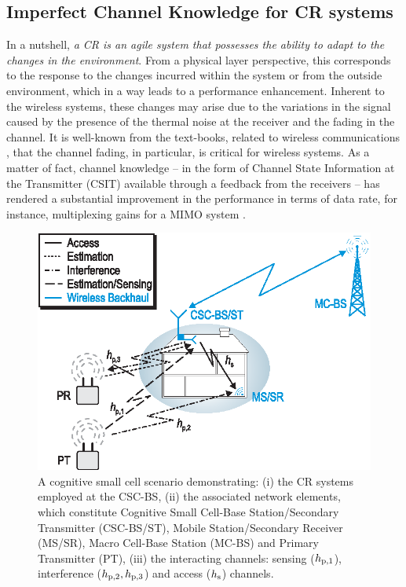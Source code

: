 \subsection{Imperfect Channel Knowledge for CR systems}

In a nutshell, \textit{a CR is an agile system that possesses the ability to adapt to the changes in the environment}. From a physical layer perspective, this corresponds to the response to the changes incurred within the system or from the outside environment, which in a way leads to a performance enhancement. Inherent to the wireless systems, these changes may arise due to the variations in the signal caused by the presence of the thermal noise at the receiver and the fading in the channel. It is well-known from the text-books, related to wireless communications \cite{simon2005, Goldsmith05, Tse05}, that the channel fading, in particular, is critical for wireless systems. As a matter of fact, channel knowledge -- in the form of Channel State Information at the Transmitter (CSIT) available through a feedback from the receivers -- has rendered a substantial improvement in the performance in terms of data rate, for instance, multiplexing gains for a MIMO system \cite{Ali12}. 


\begin{figure}[!t]
\centering
\includegraphics[width = \figscalet]{figures/CR_Scenario_Hybrid}
\caption{A cognitive small cell scenario demonstrating: (i) the CR systems employed at the CSC-BS, (ii) the associated network elements, which constitute Cognitive Small Cell-Base Station/Secondary Transmitter (CSC-BS/ST), Mobile Station/Secondary Receiver (MS/SR), Macro Cell-Base Station (MC-BS) and Primary Transmitter (PT), (iii) the interacting channels: sensing ($h_{\text{p,1}}$), interference ($h_{\text{p,2}}, h_{\text{p,3}}$) and access ($h_{\text{s}}$) channels.}
\label{fig_Int:scenario}
\end{figure}



